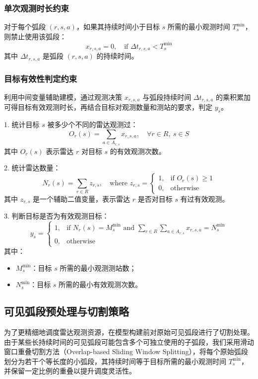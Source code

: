 \documentclass[openany,zihao=-4,UTF8]{ctexart}
\begin{document}
\subsubsection{单次观测时长约束}
对于每个弧段 $(r, s, a)$，如果其持续时间小于目标 $s$ 所需的最小观测时间 $T_s^{\min}$，则禁止使用该弧段：
$$
    x_{r,s,a} = 0, \quad \text{if } \Delta t_{r,s,a} < T_s^{\min}
$$
其中 $\Delta t_{r,s,a}$ 是弧段 $(r, s, a)$ 的持续时间。

\subsubsection{目标有效性判定约束}
利用中间变量辅助建模，通过观测决策 $x_{r,s,a}$ 与弧段持续时间 $\Delta t_{r,s,a}$ 的乘积累加可得目标有效观测时长，再结合目标对观测数量和测站的要求，判定 $y_s$。

1. 统计目标 $s$ 被多少个不同的雷达观测过：
$$
    O_r(s) = \sum_{a \in A_{r,s}} x_{r,s,a}, \quad \forall r \in R,\ s \in S
$$
其中 $O_r(s)$ 表示雷达 $r$ 对目标 $s$ 的有效观测次数。

2. 统计雷达数量：
$$
    N_r(s) = \sum_{r \in R} z_{r,s}, \quad \text{where } z_{r,s} = 
    \begin{cases}
        1, & \text{if } O_r(s) \geq 1 \\
        0, & \text{otherwise}
    \end{cases}
$$
其中 $z_{r,s}$ 是一个辅助二值变量，表示雷达 $r$ 是否对目标 $s$ 有过有效观测。

3. 判断目标是否为有效观测目标：
$$
    y_s = 
    \begin{cases}
        1, & \text{if } N_r(s) = M_s^{\min} \text{ and } \sum_{r \in R} \sum_{a \in A_{r,s}} x_{r,s,a} = N_s^{\min} \\
        0, & \text{otherwise}
    \end{cases}
$$
其中：
\begin{itemize}
    \item $M_s^{\min}$：目标 $s$ 所需的最小观测测站数；
    \item $N_s^{\min}$：目标 $s$ 所需的最小有效观测次数。
\end{itemize}

\subsection{可见弧段预处理与切割策略}
为了更精细地调度雷达观测资源，在模型构建前对原始可见弧段进行了切割处理。由于某些长持续时间的可见弧段可能包含多个可独立使用的子弧段，我们采用滑动窗口重叠切割方法（Overlap-based Sliding Window Splitting），将每个原始弧段划分为若干个等长度的小弧段，其持续时间等于目标所需的最小观测时间 $T_s^{\min}$，并保留一定比例的重叠以提升调度灵活性。
\end{document}
